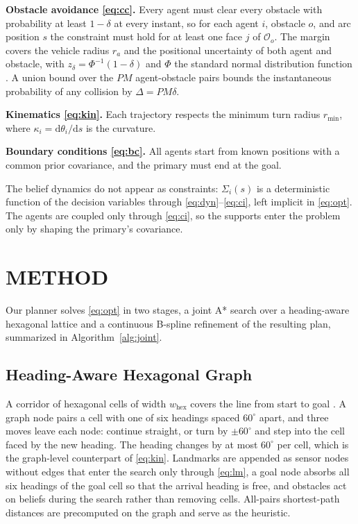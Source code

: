 \documentclass[letterpaper, 10 pt, conference]{ieeeconf}
\theoremstyle{remark}
\begin{document}
\textbf{Obstacle avoidance \eqref{eq:cc}.} Every agent must clear every
obstacle with probability at least $1-\delta$ at every instant, so for each
agent $i$, obstacle $o$, and arc position $s$ the constraint must hold for at
least one face $j$ of $\mathcal{O}_o$. The margin covers the vehicle radius
$r_a$ and the positional uncertainty of both agent and obstacle, with
$z_\delta = \Phi^{-1}(1-\delta)$ and $\Phi$ the standard normal distribution
function \cite{blackmore2011chance}. A union bound over the $PM$
agent-obstacle pairs bounds the instantaneous probability of any collision by
$\Delta = PM\delta$.

\textbf{Kinematics \eqref{eq:kin}.} Each trajectory respects the minimum
turn radius $r_{\min}$, where $\kappa_i = \mathrm{d}\theta_i/\mathrm{d}s$ is
the curvature.

\textbf{Boundary conditions \eqref{eq:bc}.} All agents start from known
positions with a common prior covariance, and the primary must end at the
goal.

The belief dynamics do not appear as constraints: $\Sigma_i(s)$ is a
deterministic function of the decision variables through
\eqref{eq:dyn}--\eqref{eq:ci}, left implicit in \eqref{eq:opt}. The agents
are coupled only through \eqref{eq:ci}, so the supports enter the problem
only by shaping the primary's covariance.

\section{METHOD}
\label{sec:method}
Our planner solves \eqref{eq:opt} in two stages, a joint A* search over a
heading-aware hexagonal lattice and a continuous B-spline refinement of the
resulting plan, summarized in Algorithm~\ref{alg:joint}.

\subsection{Heading-Aware Hexagonal Graph}

A corridor of hexagonal cells of width $w_{\mathrm{hex}}$ covers the line
from start to goal \cite{duszak2021hexgrid}. A graph node pairs a cell with
one of six headings spaced $60^\circ$ apart, and three moves leave each
node: continue straight, or turn by $\pm 60^\circ$ and step into the cell
faced by the new heading. The heading changes by at most $60^\circ$ per
cell, which is the graph-level counterpart of \eqref{eq:kin}. Landmarks are
appended as sensor nodes without edges that enter the search only through
\eqref{eq:lm}, a goal node absorbs all six headings of the goal cell so that
the arrival heading is free, and obstacles act on beliefs during the search
rather than removing cells. All-pairs shortest-path distances are
precomputed on the graph and serve as the heuristic.
\end{document}
